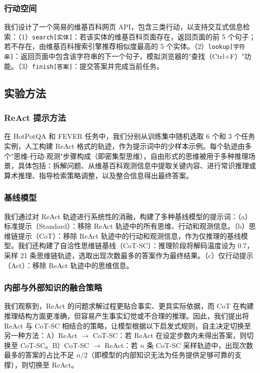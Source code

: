 \subsubsection*{行动空间}

我们设计了一个简易的维基百科网页 API，包含三类行动，以支持交互式信息检索：（1）\texttt{search[实体]}：若该实体的维基百科页面存在，返回页面的前 5 个句子；若不存在，由维基百科搜索引擎推荐相似度最高的 5 个实体。（2）\texttt{lookup[字符串]}：返回页面中包含该字符串的下一个句子，模拟浏览器的"查找（Ctrl+F）"功能。（3）\texttt{finish[答案]}：提交答案并完成当前任务。

\subsection{实验方法}

\subsubsection*{ReAct 提示方法}

在 HotPotQA 和 FEVER 任务中，我们分别从训练集中随机选取 6 个和 3 个任务实例，人工构建 ReAct 格式的轨迹，作为提示词中的少样本示例。每个轨迹由多个"思维-行动-观测"步骤构成（即密集型思维），自由形式的思维被用于多种推理场景，具体包括：拆解问题、从维基百科观测信息中提取关键内容、进行常识推理或算术推理、指导检索策略调整，以及整合信息得出最终答案。

\subsubsection*{基线模型}

我们通过对 ReAct 轨迹进行系统性的消融，构建了多种基线模型的提示词：（a）标准提示（Standard）：移除 ReAct 轨迹中的所有思维、行动和观测信息。（b）思维链提示（CoT）：移除 ReAct 轨迹中的行动和观测信息，作为仅推理的基线模型。我们还构建了自洽性思维链基线（CoT-SC）：推理阶段将解码温度设为 0.7，采样 21 条思维链轨迹，选取出现次数最多的答案作为最终结果。（c）仅行动提示（Act）：移除 ReAct 轨迹中的思维信息。

\subsubsection*{内部与外部知识的融合策略}

我们观察到，ReAct 的问题求解过程更贴合事实、更具实际依据，而 CoT 在构建推理结构方面更准确，但容易产生事实幻觉或不合理的推理。因此，我们提出将 ReAct 与 CoT-SC 相结合的策略，让模型根据以下启发式规则，自主决定切换至另一种方法：A）ReAct $\to$ CoT-SC：若 ReAct 在设定步数内未得出答案，则切换至 CoT-SC。B）CoT-SC $\to$ ReAct：若 $n$ 条 CoT-SC 采样轨迹中，出现次数最多的答案的占比不足 $n/2$（即模型的内部知识无法为任务提供足够可靠的支撑），则切换至 ReAct。

